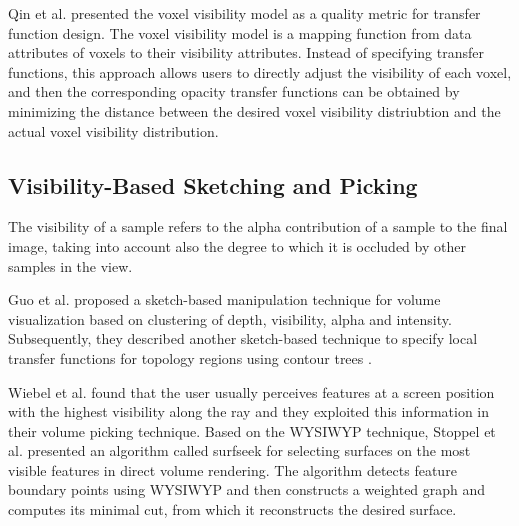 \documentclass{egpubl}
\begin{document}
Qin et al. \cite{qin_voxel_2015} presented the voxel visibility model as a quality metric for transfer function design.
The voxel visibility model is a mapping function from data attributes of voxels to their visibility attributes. Instead of specifying transfer functions, this approach allows users to directly adjust the visibility of each voxel, and then the corresponding opacity transfer functions can be obtained by minimizing the distance between the desired voxel visibility distriubtion and the actual voxel visibility distribution.

\subsection{Visibility-Based Sketching and Picking}

The visibility of a sample refers to the alpha contribution of a sample to the final image, taking into account also the degree to which it is occluded by other samples in the view.

Guo et al. \cite{guo_wysiwyg_2011} proposed a sketch-based manipulation technique for volume visualization based on clustering of depth, visibility, alpha and intensity. Subsequently, they described another sketch-based technique to specify local transfer functions for topology regions using contour trees \cite{guo_local_2013}. 

Wiebel et al. \cite{wiebel_wysiwyp:_2012} found that the user usually perceives features at a screen position with the highest visibility along the ray and they exploited this information in their volume picking technique.
Based on the WYSIWYP technique, Stoppel et al. \cite{elmqvist_visibility-driven_2014} presented an algorithm called surfseek for selecting surfaces on the most visible features in direct volume rendering. The algorithm detects feature boundary points using WYSIWYP and then constructs a weighted graph and computes its minimal cut, from which it reconstructs the desired surface.

\end{document}
